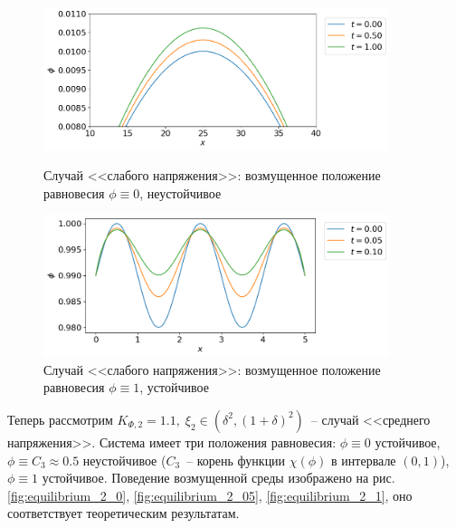 \begin{figure}[!t]
	\centering
	\includegraphics[width=0.9\textwidth]{figures/equilibrium_1_0.png}
	\vspace{-0.3cm}
	\caption{Случай <<слабого напряжения>>: возмущенное положение равновесия $\phi \equiv 0$, неустойчивое}
	\label{fig:equilibrium_1_0}
	\vspace{0.5cm}
	
	\includegraphics[width=0.9\textwidth]{figures/equilibrium_1_1.png}
	\vspace{-0.3cm}
	\caption{Случай <<слабого напряжения>>: возмущенное положение равновесия $\phi \equiv 1$, устойчивое}
	\label{fig:equilibrium_1_1}
\end{figure}

Теперь рассмотрим $K_{\Phi, 2} = 1.1, \; \xi_2 \in (\delta^2, (1 + \delta)^2)$~-- случай <<среднего напряжения>>. Система имеет три положения равновесия: $\phi \equiv 0$ устойчивое, $\phi \equiv C_3 \approx 0.5$ неустойчивое ($C_3$~-- корень функции $\chi(\phi)$ в интервале $(0, 1)$), $\phi \equiv 1$ устойчивое. Поведение возмущенной среды изображено на \linebreak рис. \ref{fig:equilibrium_2_0}, \ref{fig:equilibrium_2_05}, \ref{fig:equilibrium_2_1}, оно соответствует теоретическим результатам.

